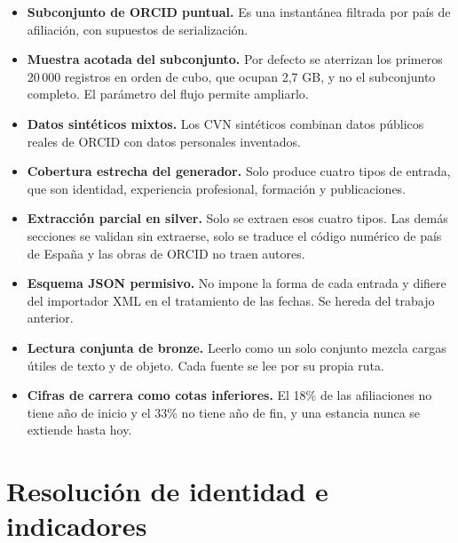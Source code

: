 \begin{itemize}
  \item \textbf{Subconjunto de ORCID puntual.} Es una instantánea filtrada
  por país de afiliación, con supuestos de serialización.
  \item \textbf{Muestra acotada del subconjunto.} Por defecto se aterrizan
  los primeros 20\,000 registros en orden de cubo, que ocupan 2,7 GB, y no
  el subconjunto completo. El parámetro del flujo permite ampliarlo.
  \item \textbf{Datos sintéticos mixtos.} Los CVN sintéticos combinan datos
  públicos reales de ORCID con datos personales inventados.
  \item \textbf{Cobertura estrecha del generador.} Solo produce cuatro tipos
  de entrada, que son identidad, experiencia profesional, formación y
  publicaciones.
  \item \textbf{Extracción parcial en silver.} Solo se extraen esos cuatro
  tipos. Las demás secciones se validan sin extraerse, solo se traduce el
  código numérico de país de España y las obras de ORCID no traen autores.
  \item \textbf{Esquema JSON permisivo.} No impone la forma de cada entrada y
  difiere del importador XML en el tratamiento de las fechas. Se hereda del
  trabajo anterior.
  \item \textbf{Lectura conjunta de bronze.} Leerlo como un solo conjunto
  mezcla cargas útiles de texto y de objeto. Cada fuente se lee por su propia
  ruta.
  \item \textbf{Cifras de carrera como cotas inferiores.} El 18\% de las
  afiliaciones no tiene año de inicio y el 33\% no tiene año de fin, y una
  estancia nunca se extiende hasta hoy.
\end{itemize}

\section{Resolución de identidad e indicadores}
\label{sec:anexo_limitaciones_resolucion}

